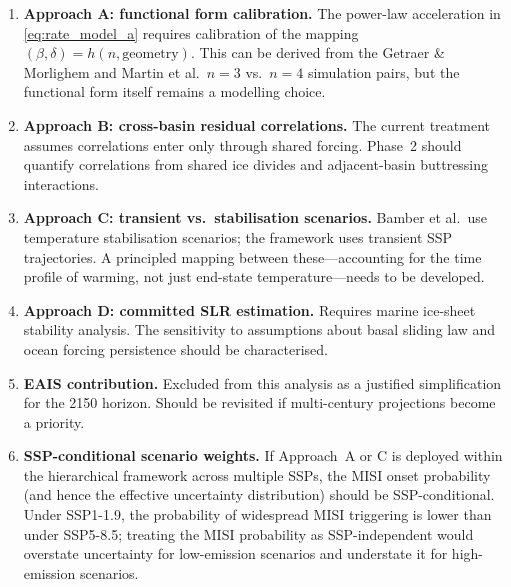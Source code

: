 \documentclass[11pt]{article}
\begin{document}
\begin{enumerate}
  \item \textbf{Approach A: functional form calibration.}  The power-law acceleration in \cref{eq:rate_model_a} requires calibration of the mapping $(\beta, \delta) = h(n, \text{geometry})$.  This can be derived from the Getraer \& Morlighem and Martin et al.\ $n = 3$ vs.\ $n = 4$ simulation pairs, but the functional form itself remains a modelling choice.

  \item \textbf{Approach B: cross-basin residual correlations.}  The current treatment assumes correlations enter only through shared forcing.  Phase~2 should quantify correlations from shared ice divides and adjacent-basin buttressing interactions.

  \item \textbf{Approach C: transient vs.\ stabilisation scenarios.}  Bamber et al.\ use temperature stabilisation scenarios; the framework uses transient SSP trajectories.  A principled mapping between these---accounting for the time profile of warming, not just end-state temperature---needs to be developed.

  \item \textbf{Approach D: committed SLR estimation.}  Requires marine ice-sheet stability analysis.  The sensitivity to assumptions about basal sliding law and ocean forcing persistence should be characterised.

  \item \textbf{EAIS contribution.}  Excluded from this analysis as a justified simplification for the 2150 horizon.  Should be revisited if multi-century projections become a priority.

  \item \textbf{SSP-conditional scenario weights.}  If Approach~A or C is deployed within the hierarchical framework across multiple SSPs, the MISI onset probability (and hence the effective uncertainty distribution) should be SSP-conditional.  Under SSP1-1.9, the probability of widespread MISI triggering is lower than under SSP5-8.5; treating the MISI probability as SSP-independent would overstate uncertainty for low-emission scenarios and understate it for high-emission scenarios.
\end{enumerate}


\end{document}
